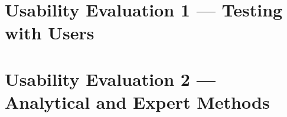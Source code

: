 \section{Usability Evaluation 1 --- Testing with Users}

\section{Usability Evaluation 2 --- Analytical and Expert Methods}
